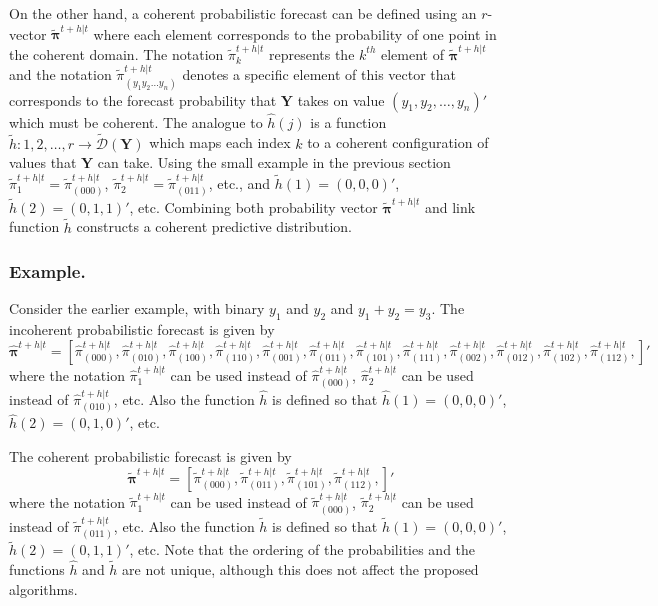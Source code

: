 \documentclass[a4paper,review,12pt,authoryear]{elsarticle}
\newcommand{\bY}{\mathbf{Y}}
\newcommand{\bpi}{\bm{\pi}}
\begin{document}
  On the other hand, a coherent probabilistic forecast can be defined using an $r$-vector $\tilde{\bpi}^{t+h|t}$ where each element corresponds to the probability of one point in the coherent domain. 
  The notation $\tilde{\pi}_k^{t+h|t}$ represents the $k^{th}$ element of $\tilde{\bpi}^{t+h|t}$ and the notation $\tilde{\pi}_{(y_1 y_2 \dots y_n)}^{t+h|t}$ denotes a specific element of this vector that corresponds to the forecast probability that $\bY$ takes on value $(y_1,y_2,\dots,y_n)'$ which must be coherent. 
  The analogue to $\hat{h}(j)$ is a function  $\tilde{h}:{1,2,\dots,r}\rightarrow\tilde{\mathcal{D}}(\bY)$ which maps each index $k$ to a coherent configuration of values that $\bY$ can take. 
  Using the small example in the previous section $\tilde{\pi}_1^{t+h|t}=\tilde{\pi}_{(000)}^{t+h|t}$, $\tilde{\pi}_2^{t+h|t}=\tilde{\pi}_{(011)}^{t+h|t}$, etc., and $\tilde{h}(1)=(0,0,0)'$, $\tilde{h}(2)=(0,1,1)'$, etc.
  Combining both probability vector $\tilde{\bpi}^{t+h|t}$ and link function $\tilde{h}$ constructs a coherent predictive distribution.
  
  \subsubsection*{\textbf{Example}.}
  
  Consider the earlier example, with binary $y_1$ and $y_2$ and $y_1+y_2=y_3$. The incoherent probabilistic forecast is given by
  \[
    \hat{\bpi}^{t+h|t}= \left[       
      \hat{\pi}^{t+h|t}_{(000)},
       \hat{\pi}^{t+h|t}_{(010)},
       \hat{\pi}^{t+h|t}_{(100)},
       \hat{\pi}^{t+h|t}_{(110)},
       \hat{\pi}^{t+h|t}_{(001)},
       \hat{\pi}^{t+h|t}_{(011)},
       \hat{\pi}^{t+h|t}_{(101)},
       \hat{\pi}^{t+h|t}_{(111)},
       \hat{\pi}^{t+h|t}_{(002)},
       \hat{\pi}^{t+h|t}_{(012)},
       \hat{\pi}^{t+h|t}_{(102)},
       \hat{\pi}^{t+h|t}_{(112)},
       \right]'
  \]
  where the notation $\hat{\pi}^{t+h|t}_{1}$ can be used instead of $\hat{\pi}^{t+h|t}_{(000)}$, $\hat{\pi}^{t+h|t}_{2}$ can be used instead of $\hat{\pi}^{t+h|t}_{(010)}$, etc. Also the function $\hat{h}$ is defined so that $\hat{h}(1)=(0,0,0)'$, $\hat{h}(2)=(0,1,0)'$, etc.
  
  The coherent probabilistic forecast is given by
  \[
  \tilde{\bpi}^{t+h|t}=\left[
  \tilde{\pi}^{t+h|t}_{(000)},
  \tilde{\pi}^{t+h|t}_{(011)},
  \tilde{\pi}^{t+h|t}_{(101)},
  \tilde{\pi}^{t+h|t}_{(112)},
  \right]'\]
  where the notation $\tilde{\pi}^{t+h|t}_{1}$ can be used instead of $\tilde{\pi}^{t+h|t}_{(000)}$, $\tilde{\pi}^{t+h|t}_{2}$ can be used instead of $\tilde{\pi}^{t+h|t}_{(011)}$, etc. Also the function $\tilde{h}$ is defined so that $\tilde{h}(1)=(0,0,0)'$, $\tilde{h}(2)=(0,1,1)'$, etc. Note that the ordering of the probabilities and the functions $\hat{h}$ and $\tilde{h}$ are not unique, although this does not affect the proposed algorithms.
\end{document}
